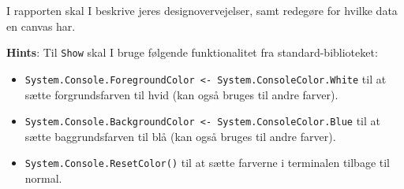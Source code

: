 I rapporten skal I beskrive jeres designovervejelser, samt redegøre
for hvilke data en canvas har.

\textbf{Hints}: Til \lstinline{Show} skal I bruge følgende
funktionalitet fra standard-biblioteket:

\begin{itemize}
\item \lstinline{System.Console.ForegroundColor <- System.ConsoleColor.White}
  til at sætte forgrundsfarven til hvid
  (kan også bruges til andre farver).
\item \lstinline{System.Console.BackgroundColor <- System.ConsoleColor.Blue}
  til at sætte baggrundsfarven til blå
  (kan også bruges til andre farver).
\item \lstinline{System.Console.ResetColor()} til at sætte farverne i
  terminalen tilbage til normal.
\end{itemize}


